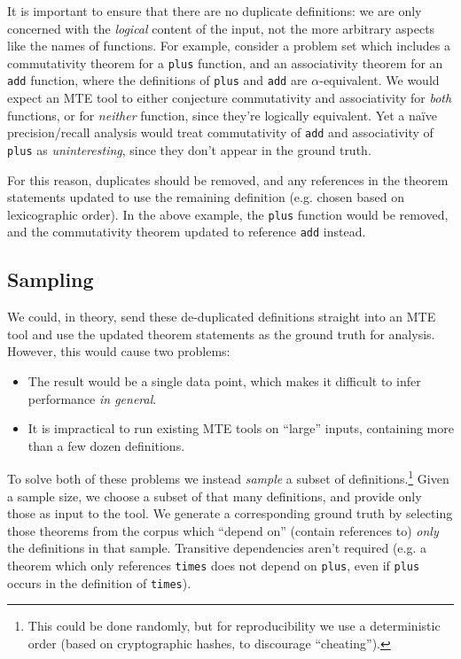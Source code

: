 It is important to ensure that there are no duplicate definitions: we are only
concerned with the \emph{logical} content of the input, not the more arbitrary
aspects like the names of functions. For example, consider a problem set which
includes a commutativity theorem for a \texttt{plus} function, and an
associativity theorem for an \texttt{add} function, where the definitions of
\texttt{plus} and \texttt{add} are $\alpha$-equivalent. We would expect an MTE
tool to either conjecture commutativity and associativity for \emph{both}
functions, or for \emph{neither} function, since they're logically equivalent.
Yet a na\"ive precision/recall analysis would treat commutativity of
\texttt{add} and associativity of \texttt{plus} as \emph{uninteresting}, since
they don't appear in the ground truth.

For this reason, duplicates should be removed, and any references in the theorem
statements updated to use the remaining definition (e.g. chosen based on
lexicographic order). In the above example, the \texttt{plus} function would be
removed, and the commutativity theorem updated to reference \texttt{add}
instead.

\subsection{Sampling}

We could, in theory, send these de-duplicated definitions straight into an MTE
tool and use the updated theorem statements as the ground truth for analysis.
However, this would cause two problems:

\begin{itemize}
\item The result would be a single data point, which makes it difficult to
  infer performance \emph{in general}.
\item It is impractical to run existing MTE tools on ``large'' inputs,
  containing more than a few dozen definitions.
\end{itemize}

To solve both of these problems we instead \emph{sample} a subset of
definitions.\footnote{This could be done randomly, but for reproducibility we
  use a deterministic order (based on cryptographic hashes, to discourage
  ``cheating'').} Given a sample size, we choose a subset of that many definitions,
and provide only those as input to the tool. We generate a corresponding
ground truth by selecting those theorems from the corpus which ``depend on''
(contain references to) \emph{only} the definitions in that sample. Transitive
dependencies aren't required (e.g. a theorem which only references
\texttt{times} does not depend on \texttt{plus}, even if \texttt{plus} occurs in
the definition of \texttt{times}).

